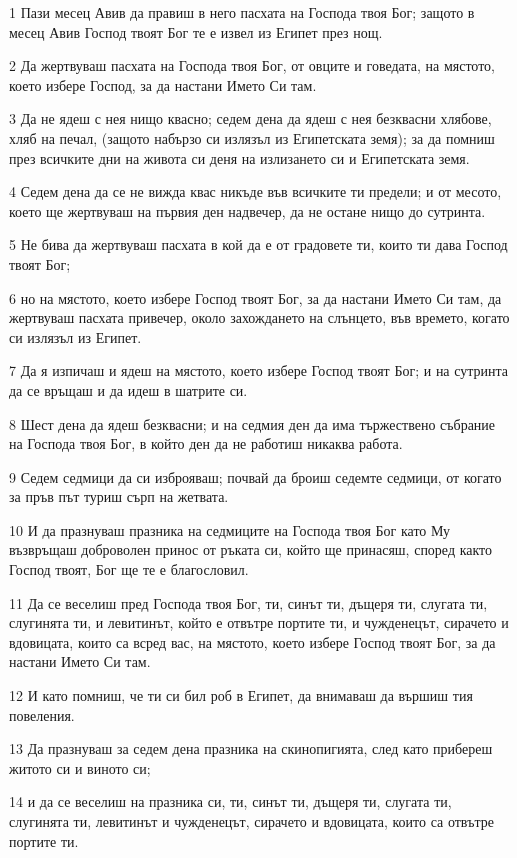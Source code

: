 \par 1 Пази месец Авив да правиш в него пасхата на Господа твоя Бог; защото в месец Авив Господ твоят Бог те е извел из Египет през нощ.
\par 2 Да жертвуваш пасхата на Господа твоя Бог, от овците и говедата, на мястото, което избере Господ, за да настани Името Си там.
\par 3 Да не ядеш с нея нищо квасно; седем дена да ядеш с нея безквасни хлябове, хляб на печал, (защото набързо си излязъл из Египетската земя); за да помниш през всичките дни на живота си деня на излизането си и Египетската земя.
\par 4 Седем дена да се не вижда квас никъде във всичките ти предели; и от месото, което ще жертвуваш на първия ден надвечер, да не остане нищо до сутринта.
\par 5 Не бива да жертвуваш пасхата в кой да е от градовете ти, които ти дава Господ твоят Бог;
\par 6 но на мястото, което избере Господ твоят Бог, за да настани Името Си там, да жертвуваш пасхата привечер, около захождането на слънцето, във времето, когато си излязъл из Египет.
\par 7 Да я изпичаш и ядеш на мястото, което избере Господ твоят Бог; и на сутринта да се връщаш и да идеш в шатрите си.
\par 8 Шест дена да ядеш безквасни; и на седмия ден да има тържествено събрание на Господа твоя Бог, в който ден да не работиш никаква работа.
\par 9 Седем седмици да си изброяваш; почвай да броиш седемте седмици, от когато за пръв път туриш сърп на жетвата.
\par 10 И да празнуваш празника на седмиците на Господа твоя Бог като Му възвръщаш доброволен принос от ръката си, който ще принасяш, според както Господ твоят, Бог ще те е благословил.
\par 11 Да се веселиш пред Господа твоя Бог, ти, синът ти, дъщеря ти, слугата ти, слугинята ти, и левитинът, който е отвътре портите ти, и чужденецът, сирачето и вдовицата, които са всред вас, на мястото, което избере Господ твоят Бог, за да настани Името Си там.
\par 12 И като помниш, че ти си бил роб в Египет, да внимаваш да вършиш тия повеления.
\par 13 Да празнуваш за седем дена празника на скинопигията, след като прибереш житото си и виното си;
\par 14 и да се веселиш на празника си, ти, синът ти, дъщеря ти, слугата ти, слугинята ти, левитинът и чужденецът, сирачето и вдовицата, които са отвътре портите ти.

